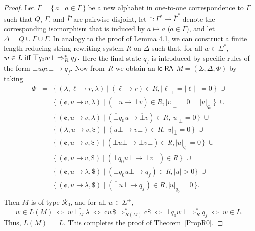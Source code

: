 \begin{proof}
Let $\overline{\Gamma}=\{\,\overline{a} \mid a\in  \Gamma\,\}$ be a new alphabet in one-to-one correspondence to $\Gamma$ such that $Q$, $\Gamma$, and $\overline{\Gamma}$ are pairwise disjoint, let $\overline{\phantom{a}}:\Gamma^*\to {\overline{\Gamma}}^*$ denote the corresponding isomorphism that is induced by $a\mapsto\overline{a}$ ($a\in\Gamma$), and let $\Delta = Q\cup\Gamma \cup \overline{\Gamma}$. In analogy to the proof of \cite{N2005} Lemma 4.1, we can construct a finite length-reducing string-rewriting system $R$ on $\Delta$ such that, for all $w\in\Sigma^*$, $w\in L \textup{ iff }  \overline{\bot}q_0w\bot \Rightarrow_R^*q_f.$ Here the final state $q_f$ is introduced by specific rules of the form $\overline{\bot} \overline{u} qv\bot \to q_f$. Now from~$R$ we obtain an $\lcRA$ $M = (\Sigma,\Delta,\Phi)$ by taking
$$\begin{array}{lcl}
\Phi  & = &\{\,(\lambda, \ell\to r, \lambda)\mid (\ell\to r)\in R,|\ell|_{\overline{\bot}}=|\ell|_\bot=0\,\}\;\cup\\
      &   &\{\,(\cent, u\to v, \lambda)\mid (\overline{\bot}u\to \overline{\bot}v)\in R, |u|_\bot = 0 =|u|_{q_0}\, \}\;\cup\\
   &   &\{\,(\cent, u\to v, \lambda)\mid (\overline{\bot}q_0u\to \overline{\bot}v)\in R, |u|_\bot = 0\, \}\;\cup\\
   &   &\{\,(\lambda, u\to v, \$)\mid (u\bot\to v\bot)\in R, |u|_{\overline{\bot}} = 0\, \}\;\cup\\
   &   &\{\,(\cent, u\to v, \$)\mid (\overline{\bot}u\bot\to \overline{\bot}v\bot)\in R, |u|_{q_0}=0\, \}\;\cup\\
   &   &\{\,(\cent, u\to v, \$)\mid (\overline{\bot}q_0u\bot\to \overline{\bot}v\bot)\in R\, \}\;\cup\\
   &   &\{\,(\cent, u\to \lambda, \$)\mid (\overline{\bot}q_0u\bot\to q_f)\in R,|u|>0 \}\;\cup\\
   &   &\{\,(\cent, u\to\lambda,\$) \mid (\overline{\bot}u\bot\to q_f)\in R, |u|_{q_0}=0\,\}.\\
\end{array}$$
Then $M$ is of type $\mathcal{R}_0$, and for all $w\in\Sigma^+$,
$$w\in L(M) \;\Leftrightarrow\;  w\vdash_M^*\lambda
            \;\Leftrightarrow\;  \cent w\$ \Rightarrow_{R(M)}^* \cent \$
            \;\Leftrightarrow\;  \overline{\bot}q_0 w\bot \Rightarrow_R^* q_f
            \;\Leftrightarrow\;  w\in L.$$
Thus, $L(M)\, \dot{=}\, L$. This completes the proof of Theorem~\ref{PropR0}.
\end{proof}

